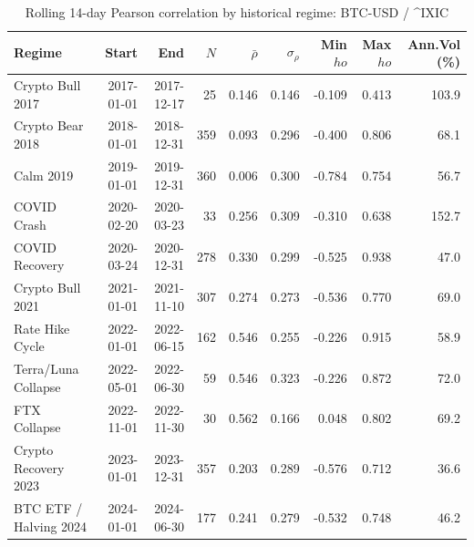 \begin{table}[H]
\centering
\small
\caption{Rolling 14-day Pearson correlation by historical regime: BTC-USD / ^IXIC}
\label{tab:regime_corr_BTCUSDIXIC}
\begin{tabular}{lrrrrrrrr}
\toprule
Regime & Start & End & $N$ & $\bar{\rho}$ & $\sigma_\rho$ & Min $
ho$ & Max $
ho$ & Ann.Vol (\%) \\
\midrule
Crypto Bull 2017 & 2017-01-01 & 2017-12-17 & 25 & 0.146 & 0.146 & -0.109 & 0.413 & 103.9 \\
Crypto Bear 2018 & 2018-01-01 & 2018-12-31 & 359 & 0.093 & 0.296 & -0.400 & 0.806 & 68.1 \\
Calm 2019 & 2019-01-01 & 2019-12-31 & 360 & 0.006 & 0.300 & -0.784 & 0.754 & 56.7 \\
COVID Crash & 2020-02-20 & 2020-03-23 & 33 & 0.256 & 0.309 & -0.310 & 0.638 & 152.7 \\
COVID Recovery & 2020-03-24 & 2020-12-31 & 278 & 0.330 & 0.299 & -0.525 & 0.938 & 47.0 \\
Crypto Bull 2021 & 2021-01-01 & 2021-11-10 & 307 & 0.274 & 0.273 & -0.536 & 0.770 & 69.0 \\
Rate Hike Cycle & 2022-01-01 & 2022-06-15 & 162 & 0.546 & 0.255 & -0.226 & 0.915 & 58.9 \\
Terra/Luna Collapse & 2022-05-01 & 2022-06-30 & 59 & 0.546 & 0.323 & -0.226 & 0.872 & 72.0 \\
FTX Collapse & 2022-11-01 & 2022-11-30 & 30 & 0.562 & 0.166 & 0.048 & 0.802 & 69.2 \\
Crypto Recovery 2023 & 2023-01-01 & 2023-12-31 & 357 & 0.203 & 0.289 & -0.576 & 0.712 & 36.6 \\
BTC ETF / Halving 2024 & 2024-01-01 & 2024-06-30 & 177 & 0.241 & 0.279 & -0.532 & 0.748 & 46.2 \\
\bottomrule
\end{tabular}
\end{table}